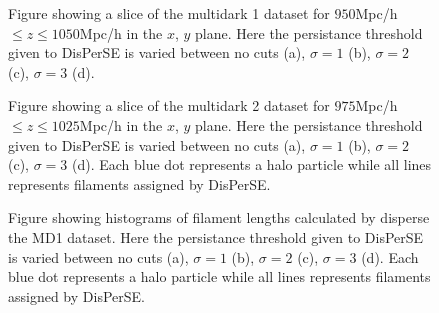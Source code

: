\begin{figure}[htbp]
    \hspace{1em}%
    \hspace{1em}%
    \caption{Figure showing a slice of the multidark 1 dataset for $950$Mpc/h$\leq z\leq1050$Mpc/h in the $x$, $y$ plane. Here the persistance threshold given to DisPerSE is varied between no cuts (a), $\sigma=1$ (b), $\sigma=2$ (c), $\sigma=3$ (d).}
    \label{fig:scatterMD1}
\end{figure}
\begin{figure}[htbp]
    \hspace{2em}%
    \hspace{2em}%
    \caption{Figure showing a slice of the multidark 2 dataset for $975$Mpc/h $\leq z\leq1025$Mpc/h in the $x$, $y$ plane. Here the persistance threshold given to DisPerSE is varied between no cuts (a), $\sigma=1$ (b), $\sigma=2$ (c), $\sigma=3$ (d). Each blue dot represents a halo particle while all lines represents filaments assigned by DisPerSE.}
    \label{fig:scatterMD2}
\end{figure}

\begin{figure}[htbp]
    \hspace{1em}%
    \hspace{1em}%
    \caption{Figure showing histograms of filament lengths calculated by disperse the MD1 dataset. Here the persistance threshold given to DisPerSE is varied between no cuts (a), $\sigma=1$ (b), $\sigma=2$ (c), $\sigma=3$ (d). Each blue dot represents a halo particle while all lines represents filaments assigned by DisPerSE.}
    \label{fig:histMD1}
\end{figure}

